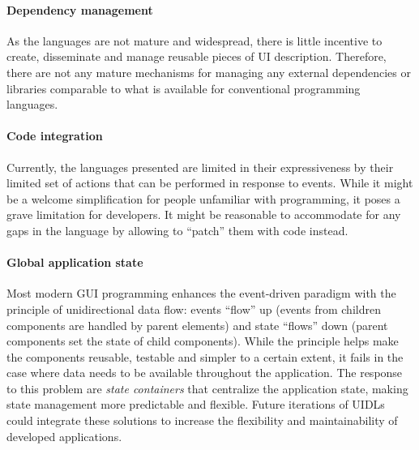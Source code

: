 

\paragraph{Dependency management}
As the languages are not mature and widespread, there is little incentive to create, disseminate and manage reusable pieces of UI description.
Therefore, there are not any mature mechanisms for managing any external dependencies or libraries comparable to what is available for conventional programming languages.

\paragraph{Code integration}
Currently, the languages presented are limited in their expressiveness by their limited set of actions that can be performed in response to events.
While it might be a welcome simplification for people unfamiliar with programming, it poses a grave limitation for developers.
It might be reasonable to accommodate for any gaps in the language by allowing to \enquote{patch} them with code instead.


\paragraph{Global application state}
Most modern GUI programming enhances the event-driven paradigm with the principle of unidirectional data flow: events \enquote{flow} up (events from children components are handled by parent elements) and state \enquote{flows} down (parent components set the state of child components).
While the principle helps make the components reusable, testable and simpler to a certain extent, it fails in the case where data needs to be available throughout the application.
The response to this problem are \emph{state containers} that centralize the application state, making state management more predictable and flexible.
Future iterations of UIDLs could integrate these solutions to increase the flexibility and maintainability of developed applications.

